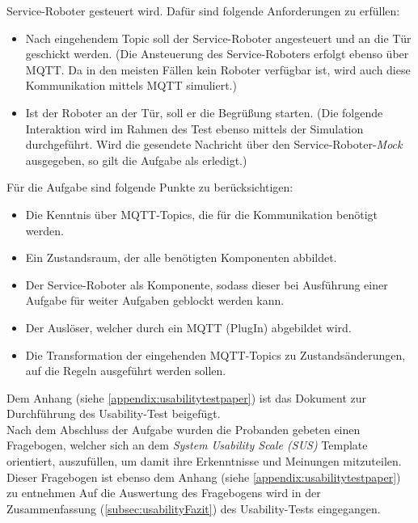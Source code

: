         Service-Roboter gesteuert wird. Dafür sind folgende Anforderungen zu erfüllen: 
        \begin{itemize}
            \item Nach eingehendem Topic soll der Service-Roboter angesteuert und an die Tür geschickt werden. 
            (Die Ansteuerung des Service-Roboters erfolgt ebenso über \acs{MQTT}. Da in den meisten Fällen kein Roboter verfügbar ist, wird auch 
            diese Kommunikation mittels \acs{MQTT} simuliert.)
            \item Ist der Roboter an der Tür, soll er die Begrüßung starten. (Die folgende Interaktion wird im Rahmen des Test ebenso mittels der Simulation durchgeführt. 
            Wird die gesendete Nachricht über den Service-Roboter-\textit{Mock} ausgegeben, so gilt die Aufgabe als erledigt.)
        \end{itemize}
        Für die Aufgabe sind folgende Punkte zu berücksichtigen:
        \begin{itemize}
            \item Die Kenntnis über \acs{MQTT}-Topics, die für die Kommunikation benötigt werden.
            \item Ein Zustandsraum, der alle benötigten Komponenten abbildet.
            \item Der Service-Roboter als Komponente, sodass dieser bei Ausführung einer Aufgabe für weiter Aufgaben geblockt werden kann. 
            \item Der Auslöser, welcher durch ein \acs{MQTT} (PlugIn) abgebildet wird.
            \item Die Transformation der eingehenden \acs{MQTT}-Topics zu Zustandsänderungen, auf die Regeln ausgeführt werden sollen.
        \end{itemize}
        Dem Anhang (siehe \ref{appendix:usabilitytestpaper}) ist das Dokument zur Durchführung des Usability-Test beigefügt. 
        \\
        \linebreak
        Nach dem Abschluss der Aufgabe wurden die Probanden gebeten einen Fragebogen, welcher sich an dem \textit{System Usability Scale (SUS)} 
        Template orientiert, auszufüllen, um damit ihre Erkenntnisse und Meinungen mitzuteilen. Dieser Fragebogen ist ebenso dem Anhang (siehe \ref{appendix:usabilitytestpaper}) zu entnehmen Auf die Auswertung des Fragebogens wird in der 
        Zusammenfassung (\ref{subsec:usabilityFazit}) des Usability-Tests eingegangen. 

